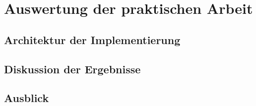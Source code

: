 \chapter{Auswertung der praktischen Arbeit}
\label{cha:3}

\section{Architektur der Implementierung}

\section{Diskussion der Ergebnisse}


\section{Ausblick}

